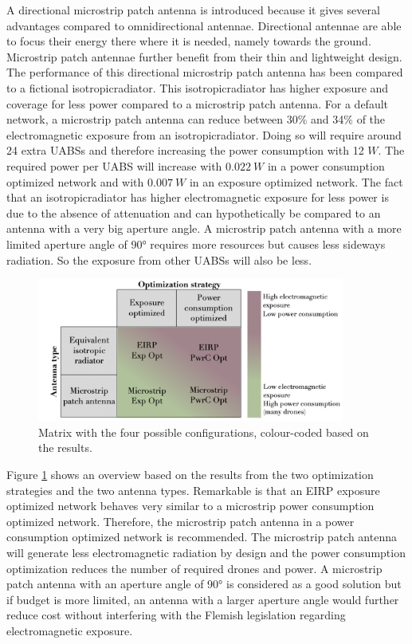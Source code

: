 A directional microstrip patch antenna is introduced because it gives several advantages compared to omnidirectional antennae.
Directional antennae are able to focus their energy there where it is needed, namely towards the ground. Microstrip patch antennae 
further benefit from their thin and lightweight design. The performance 
of this directional microstrip patch antenna has been compared to a 
fictional \gls{isotropicradiator}.
This \mbox{\gls{isotropicradiator}} has higher exposure and coverage for less power compared to a microstrip patch antenna.
For a default network, a microstrip patch antenna can reduce between 30\% and 34\% of the electromagnetic exposure 
from an \gls{isotropicradiator}. Doing so will require around 24 extra \gls{UABS}s and therefore increasing the power consumption with 12 $W$.
The required power per \gls{UABS} will increase with $0.022\ W$ 
in a power consumption optimized network and with $0.007\ W$ in an exposure optimized network.
The fact that an \gls{isotropicradiator} has higher electromagnetic exposure for less power  is due to the absence of 
attenuation and can hypothetically be compared to an antenna with a very big aperture angle.
A microstrip patch antenna with a more limited aperture angle of \ang{90} requires more resources but 
causes less sideways radiation. So the exposure from other \gls{UABS}s will also be less.

\begin{figure}[hb!]
\centering
  \includegraphics[width=0.9\textwidth]{../images/fourCasesMatrixSol.png}
  \caption{Matrix with the four possible configurations, colour-coded based on the results.}
  \label{fig:resultIllustration}
\end{figure}

Figure \ref{fig:resultIllustration} shows an overview based on the results from the two optimization strategies and the two antenna types.
Remarkable is that an \gls{EIRP} exposure optimized network behaves very similar to a microstrip power consumption optimized network.
Therefore, the microstrip patch antenna in a power consumption optimized network is recommended. 
The microstrip patch antenna will generate less electromagnetic radiation by design and
 the power consumption optimization reduces the number of required drones and power. A microstrip patch antenna with an aperture 
 angle of \ang{90} is considered as a good solution but if budget is more limited, an antenna with a larger aperture angle 
 would further reduce cost without interfering with the Flemish legislation regarding electromagnetic exposure.


